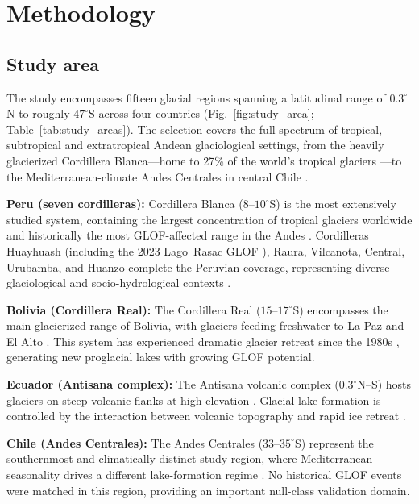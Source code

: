 \documentclass[pdflatex,sn-basic]{sn-jnl}%
\begin{document}
\section{Methodology}\label{sec:methods}

\subsection{Study area}

The study encompasses fifteen glacial regions spanning a latitudinal
range of $0.3^\circ$N to roughly $47^\circ$S across four countries
(Fig.~\ref{fig:study_area}; Table~\ref{tab:study_areas}). The
selection covers the full spectrum of tropical, subtropical and
extratropical Andean glaciological settings, from the heavily glacierized
Cordillera
Blanca---home to 27\% of the world's tropical glaciers
\citep{Rabatel2013}---to the Mediterranean-climate Andes Centrales in
central Chile \citep{Masiokas2020}.

\textbf{Peru (seven cordilleras):} Cordillera Blanca ($8$--$10^\circ$S)
is the most extensively studied system, containing the largest
concentration of tropical glaciers worldwide and historically the most
GLOF-affected range in the Andes
\citep{Emmer2022,EmmerHarrison2020,Carey2012}. Cordilleras Huayhuash (including the 2023 Lago~Rasac GLOF
\citep{Emmer2025}), Raura, Vilcanota, Central, Urubamba, and Huanzo
complete the Peruvian coverage, representing diverse glaciological and
socio-hydrological contexts \citep{Bury2011,Baraer2012,Drenkhan2019,Colonia2017}.

\textbf{Bolivia (Cordillera Real):} The Cordillera Real
($15$--$17^\circ$S) encompasses the main glacierized range of Bolivia,
with glaciers feeding freshwater to La Paz and El Alto
\citep{Immerzeel2020}. This system has experienced dramatic glacier
retreat since the 1980s \citep{Francou2003,Soruco2009}, generating new
proglacial lakes with growing GLOF potential.

\textbf{Ecuador (Antisana complex):} The Antisana volcanic complex
($0.3^\circ$N--S) hosts glaciers on steep volcanic flanks at high
elevation \citep{Caceres2010,Vuille2018}. Glacial lake formation is
controlled by the interaction between volcanic topography and rapid ice
retreat \citep{Veettil2019}.

\textbf{Chile (Andes Centrales):} The Andes Centrales
($33$--$35^\circ$S) represent the southernmost and climatically
distinct study region, where Mediterranean seasonality drives a
different lake-formation regime \citep{Masiokas2020,IribarrenAnacona2014}.
No historical GLOF events were matched in this region, providing an
important null-class validation domain.
\end{document}
